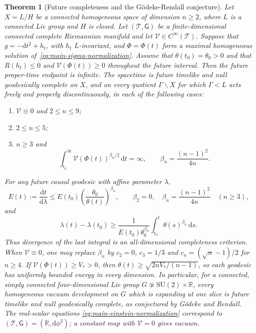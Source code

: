 \documentclass[10pt,a4paper]{amsart}
\newtheorem{theorem}{Theorem}
\newcommand{\R}{\mathbb R}
\newcommand{\dd}{\mathrm d}
\begin{document}
\begin{theorem}[Future completeness and the G\"odeke-Rendall conjecture]
\label{thm:homogeneous-future}
Let $X=L/H$ be a connected homogeneous space of dimension $n\ge2$,
where $L$ is a connected Lie group and $H$ is closed.  Let
$(\mathcal T,\mathsf G)$ be a finite-dimensional connected complete
Riemannian manifold and let $\mathcal V\in C^\infty(\mathcal T)$.
Suppose that $g=-\dd t^2+h_t$, with $h_t$
$L$-invariant, and $\Phi=\Phi(t)$ form a maximal homogeneous
solution of~\eqref{eq:main-sigma-normalization}.
Assume that $\theta(t_0)=\theta_0>0$ and that
$R(h_t)\le0$ and $\mathcal V(\Phi(t))\ge0$ throughout the future
interval.  Then the future
proper-time endpoint is infinite.  The spacetime is future timelike
and null geodesically complete on $X$, and on every quotient
$\Gamma\backslash X$ for which $\Gamma<L$ acts freely and properly
discontinuously, in each of the following cases:
\begin{enumerate}[label=\textup{(\roman*)}]
\item $\mathcal V\equiv0$ and $2\le n\le9$;
\item $2\le n\le5$;
\item $n\ge3$ and
\[
 \int_{t_0}^{\infty}
       \mathcal V(\Phi(t))^{\beta_n/2}\,\dd t=\infty,
 \qquad \beta_n=\frac{(n-1)^2}{4n}.
\]
\end{enumerate}
For any future causal geodesic with affine parameter $\lambda$,
\[
 E(t):=\frac{\dd t}{\dd\lambda}
 \le E(t_0)\left(\frac{\theta_0}{\theta(t)}\right)^{\beta_n},
 \qquad
 \beta_2=0,\quad \beta_n=\frac{(n-1)^2}{4n}\quad(n\ge3),
\]
and
\[
 \lambda(t)-\lambda(t_0)\ge
 \frac{1}{E(t_0)\theta_0^{\beta_n}}
 \int_{t_0}^{t}\theta(s)^{\beta_n}\,\dd s.
\]
Thus divergence of the last integral is an all-dimensional completeness
criterion.  When $\mathcal V\equiv0$, one may replace $\beta_n$ by
$c_2=0$, $c_3=1/3$ and $c_n=(\sqrt n-1)/2$ for $n\ge4$.
If $\mathcal V(\Phi(t))\ge V_*>0$, then
$\theta(t)\ge\sqrt{2nV_*/(n-1)}$, so each geodesic has uniformly
bounded energy in every dimension.  In particular, for a connected,
simply connected four-dimensional Lie group $G\not\simeq
\mathrm{SU}(2)\times\mathbb R$, every homogeneous vacuum development on
$G$ which is expanding at one slice is future timelike and null
geodesically complete, as conjectured by G\"odeke and Rendall.
The real-scalar equations
\eqref{eq:main-einstein-normalization} correspond to
$(\mathcal T,\mathsf G)=(\R,\dd\phi^2)$; a constant map with
$\mathcal V=0$ gives vacuum.
\end{theorem}
\end{document}
